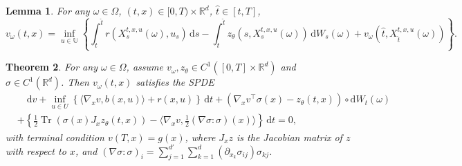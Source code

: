 \documentclass[11pt]{article}
\numberwithin{equation}{section}
\theoremstyle{plain}
\newtheorem{theorem}{Theorem}[section]
\newtheorem{lemma}[theorem]{Lemma}
\theoremstyle{definition}
\theoremstyle{remark}
\newcommand{\op}{\operatorname}
\newcommand{\R}{\mathbb{R}}
\newcommand{\dd}{\mathrm{d}}
\begin{document}
\begin{lemma} \label{lem:dp-inner-optim}
For any $\omega\in \Omega$, $(t,x)\in [0,T)\times \R^d$, $\hat{t}\in [t, T]$, 
\begin{equation} \label{eq:DP-pathwise}
    v_\omega(t,x) = \inf_{u\in \mathbb{U}} \left\{ \int_t^{\hat{t}}r(X_s^{t,x,u}(\omega), u_s)\,\dd s - \int_t^{\hat{t}} z_\theta(s,X_s^{t,x,u}(\omega))\,\dd W_s(\omega) + v_\omega(\hat{t}, X_{\hat{t}}^{t,x,u}(\omega)) \right\}.
\end{equation}
\end{lemma}

\begin{theorem} \label{thm:spde}
For any $\omega \in \Omega$, assume $v_\omega, z_\theta \in C^1([0,T]\times \R^d)$ and $\sigma \in C^1(\R^d)$. Then $v_\omega(t,x)$ satisfies the SPDE 
\begin{equation} \label{eq:spde-form}
\begin{aligned}
    &\quad \dd v + \inf_{u\in U} \left\{ \langle \nabla_x v, b(x,u) \rangle  + r(x,u)  \right\}\,\dd t + \left(\nabla_x v^\top \sigma(x) - z_\theta(t,x)\right)\circ \dd W_t(\omega) \\
    &+ \left\{\frac{1}{2}\op{Tr}\left( \sigma(x)J_xz_\theta(t,x)\right) - \langle \nabla_xv, \frac{1}{2}(\nabla \sigma:\sigma)(x) \rangle \right\}\,\dd t = 0, 
\end{aligned}
\end{equation}
with terminal condition $v(T,x) = g(x)$, where $J_x z$ is the Jacobian matrix of $z$ with respect to $x$, and $(\nabla\sigma:\sigma)_i = \sum_{j=1}^{d'}\sum_{k=1}^d (\partial_{x_k}\sigma_{ij})\sigma_{kj}$. 
\end{theorem}
\end{document}
